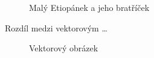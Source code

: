\documentclass[a4paper, 11pt]{article}
\begin{document}
\begin{figure}[h]
\begin{center}
{{    }
\caption{Malý Etiopánek a jeho bratříček}\label{obr1}
}
\end{center}
\end{figure}

Rozdíl medzi vektorovým \dots
\begin{figure}[h]
\begin{center}
{
\caption{Vektorový obrázek}\label{obr2}
}
\end{center}
\end{figure}
\end{document}
